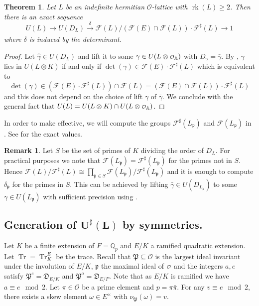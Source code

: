 \documentclass[a4paper]{amsart}
\theoremstyle{definition}
\newtheorem{remark}[definition]{Remark}
\theoremstyle{plain}
\newtheorem{theorem}[definition]{Theorem}
\DeclareMathOperator{\rk}{rk}
\DeclareMathOperator{\Tr}{Tr}
\newcommand{\QQ}{\mathbb{Q}}
\renewcommand{\AA}{\mathbb{A}}
\renewcommand{\O}{\mathcal{O}}
\newcommand{\F}{\mathcal{F}}
\newcommand{\fp}{\mathfrak{p}}
\newcommand{\FP}{\mathfrak{P}}
\newcommand{\FD}{\mathfrak{D}}
\renewcommand\o{
  \mathchoice
    {{\scriptstyle\mathcal{O}}}%
    {{\scriptstyle\mathcal{O}}}%
    {{\scriptscriptstyle\mathcal{O}}}%
    {\scalebox{.7}{$\scriptscriptstyle\mathcal{O}$}}%
  }
\newcommand{\disc}[1]{{D_{#1}}}
\begin{document}
\begin{theorem}\label{hermitianUtoUDL}
 Let $L$ be an indefinite hermitian $\O$-lattice with $\rk(L)\geq 2$. Then there is an exact sequence
 \[U(L)\rightarrow U(\disc{L}) \xrightarrow[]{\delta} \F(L)/(\F(E)\cap \F(L))\cdot \F^\sharp(L) \rightarrow 1\]
 where $\delta$ is induced by the determinant.
\end{theorem}
\begin{proof}

%
%
%
Let $\hat\gamma \in U(\disc{L})$ and lift it to some $\gamma \in U(L \otimes \o_{\AA})$ with $D_{\gamma}=\bar \gamma$.
By , $\gamma$ lies in $U(L\otimes K)$ if and only if $\det(\gamma) \in \F(E)\cdot \F^\sharp(L)$
which is equivalent to
\[\det(\gamma) \in (\F(E)\cdot \F^\sharp(L)) \cap \F(L)= (\F(E) \cap \F(L)) \cdot \F^\sharp(L) \]
and this does not depend on the choice of lift $\gamma$ of $\bar \gamma$.
We conclude with the general fact that $U(L) = U(L \otimes K) \cap U(L \otimes \o_{\AA})$.
\end{proof}
In order to make  effective,
we will compute the groups $\F^\sharp(L_\fp)$ and $\F(L_\fp)$ in  . See  for the exact values.

\begin{remark}\label{rem:hermitianUtoUDL}
Let $S$ be the set of primes of $K$ dividing the order of $\disc{L}$.
For practical purposes we note that $\F(L_\fp)=\F^\sharp(L_\fp)$ for the primes not in $S$.
Hence $\F(L)/\F^\sharp(L)\cong \prod_{\fp \in S}\F(L_\fp)/\F^\sharp(L_\fp)$ and it is enough to compute $\delta_\fp$ for the primes in $S$.
This can be achieved by lifting $\bar \gamma \in U(\disc{L_\fp})$ to some $\gamma \in U(L_\fp)$ with sufficient precision using .
\end{remark}

\subsection{Generation of $\mathbf{U^\sharp(L)}$ by symmetries.}\label{kergen}

Let $K$ be a finite extension of $F= \QQ_p$ and $E/K$ a ramified quadratic extension. Let $\Tr = \Tr^E_K$ be the trace.
Recall that $\FP\subseteq \O$ is the largest ideal invariant under the involution of $E/K$, $\fp$ the maximal ideal of $\o$ and the integers $a, e$ satisfy $\FP^e = \FD_{E/K}$ and $\FP^a = \FD_{E/F}$.
%
%
%
Note that as $E/K$ is ramified we have $a \equiv e \mod 2$.
Let $\pi \in \O$ be a prime element and $p = \pi \bar \pi$.
For any $v \equiv e \mod 2$,
there exists a skew element $\omega \in E^\times$ with $\nu_\FP(\omega)=v$.
\end{document}
